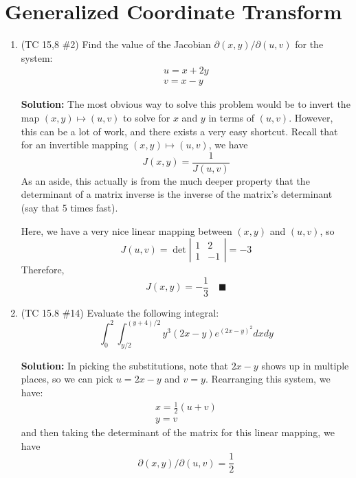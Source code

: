\documentclass[letterpaper, 11pt]{article}
\begin{document}
\section{Generalized Coordinate Transform}
\begin{enumerate}
\item (TC 15,8 \#2) Find the value of the Jacobian $\partial(x,y)/\partial (u,v)$ for the system:
\begin{gather*}
u = x + 2y \\
v = x - y
\end{gather*}

\par \textbf{Solution:} The most obvious way to solve this problem would be to invert the map $(x,y) \mapsto (u,v)$ to solve for $x$ and $y$ in terms of $(u,v)$. However, this can be a lot of work, and there exists a very easy shortcut. Recall that for an invertible mapping $(x,y) \mapsto (u,v)$, we have
\[ J(x,y) = \frac{1}{J(u,v)} \]
As an aside, this actually is from the much deeper property that the determinant of a matrix inverse is the inverse of the matrix's determinant (say that 5 times fast). 
\par Here, we have a very nice linear mapping between $(x,y)$ and $(u,v)$, so
\[ J(u,v) = \det \left| \begin{array}{cc} 1 & 2 \\ 1 & -1 \end{array} \right| = -3 \]
Therefore, 
\[ J(x,y) = -\frac{1}{3} \quad\blacksquare \]


\item (TC 15.8 \#14) Evaluate the following integral:
\[ \int_0^2 \int_{y/2}^{(y+4)/2} y^3 (2x - y )e^{(2x - y)^2} dx dy \]

\par \textbf{Solution:} In picking the substitutions, note that $2x - y$ shows up in multiple places, so we can pick $u = 2x - y$ and $v = y$. Rearranging this system, we have:
\begin{gather*}
x = \frac{1}{2} (u + v) \\ 
y = v 
\end{gather*}
and then taking the determinant of the matrix for this linear mapping, we have 
\[ \partial(x,y)/\partial(u,v) = \frac{1}{2}\]


\end{enumerate}
\end{document}
